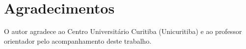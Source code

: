 \documentclass[
	article,		%
	12pt,			%
	oneside,
	a4paper,
	brazil
]{abntex2}
\begin{document}
\section*{Agradecimentos}

O autor agradece ao Centro Universitário Curitiba (Unicuritiba) e ao
professor orientador pelo acompanhamento deste trabalho.


\end{document}
